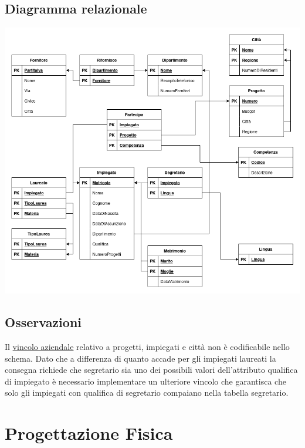 \documentclass{article}
\begin{document}
\newpage

\subsection{Diagramma relazionale}
\includegraphics[width=1\textwidth]{r.png}

\subsection{Osservazioni}
Il \hyperlink{page.9}{vincolo aziendale} relativo a progetti, impiegati e città non è codificabile nello schema.
\newline
\newline
Dato che a differenza di quanto accade per gli impiegati laureati la consegna richiede che segretario sia uno dei possibili valori dell'attributo qualifica di impiegato è necessario implementare un ulteriore vincolo che garantisca che solo gli impiegati con qualifica di segretario compaiano nella tabella segretario.

\newpage

\section{Progettazione Fisica}
\end{document}
